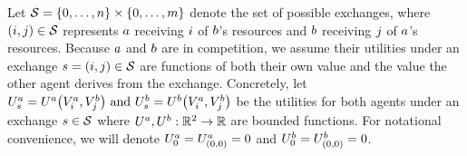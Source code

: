 

Let $\mathcal{S}=\left\{0,\ldots,n\right\}\times\left\{0,\ldots,m\right\}$
denote the set of possible exchanges, where
\(
    \left(i,j\right)\in\mathcal{S}
\)
represents $a$ receiving $i$ of $b$'s resources and 
$b$ receiving $j$ of $a$'s resources.
Because $a$ and $b$ are in competition, we assume their utilities under 
an exchange $s = (i,j)\in\mathcal{S}$ are functions of both their own value and the value the other agent derives from the exchange.
Concretely,
let
\(
    U^a_{s} = U^a\big(V^a_{i},V^b_{j}\big)
\text{ and }
    U^b_{s} = U^b\big(V^a_{i},V^b_{j}\big)
\)
be the utilities for both agents under an exchange $s\in\mathcal{S}$
where
\(
    U^a,U^b:\mathbb{R}^2\rightarrow\mathbb{R}
\)
are bounded functions. 
For notational convenience,
we will denote $U^a_{0} = U^a_{(0,0)}=0$ and
$U^b_{0} = U^b_{(0,0)}=0$.

